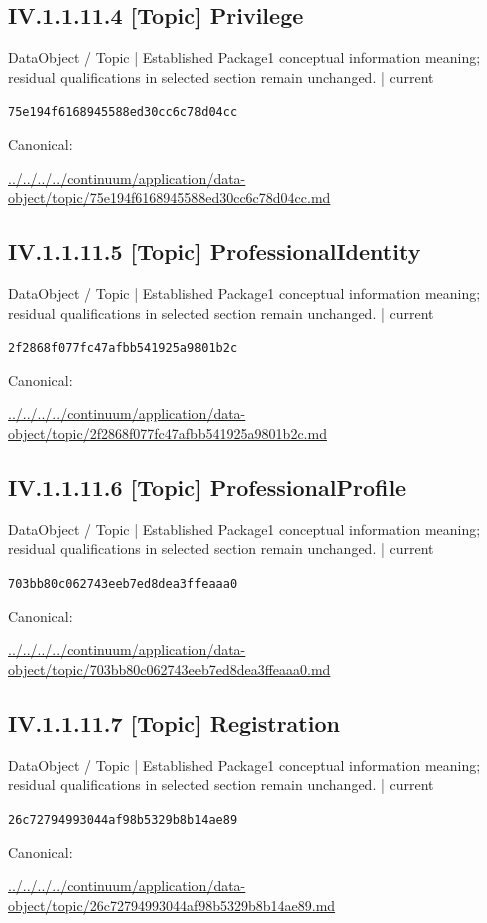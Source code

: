 \documentclass[10pt,a4paper]{article}
\begin{document}
\subsection*{IV.1.1.11.4 [Topic] Privilege}
{\small DataObject / Topic | Established Package1 conceptual information meaning; residual qualifications in selected section remain unchanged. | current}\par
\texttt{75e194f6168945588ed30cc6c78d04cc}\par
Canonical: \par
{\footnotesize\url{../../../../continuum/application/data-object/topic/75e194f6168945588ed30cc6c78d04cc.md}}\par
\subsection*{IV.1.1.11.5 [Topic] ProfessionalIdentity}
{\small DataObject / Topic | Established Package1 conceptual information meaning; residual qualifications in selected section remain unchanged. | current}\par
\texttt{2f2868f077fc47afbb541925a9801b2c}\par
Canonical: \par
{\footnotesize\url{../../../../continuum/application/data-object/topic/2f2868f077fc47afbb541925a9801b2c.md}}\par
\subsection*{IV.1.1.11.6 [Topic] ProfessionalProfile}
{\small DataObject / Topic | Established Package1 conceptual information meaning; residual qualifications in selected section remain unchanged. | current}\par
\texttt{703bb80c062743eeb7ed8dea3ffeaaa0}\par
Canonical: \par
{\footnotesize\url{../../../../continuum/application/data-object/topic/703bb80c062743eeb7ed8dea3ffeaaa0.md}}\par
\subsection*{IV.1.1.11.7 [Topic] Registration}
{\small DataObject / Topic | Established Package1 conceptual information meaning; residual qualifications in selected section remain unchanged. | current}\par
\texttt{26c72794993044af98b5329b8b14ae89}\par
Canonical: \par
{\footnotesize\url{../../../../continuum/application/data-object/topic/26c72794993044af98b5329b8b14ae89.md}}\par
\end{document}
